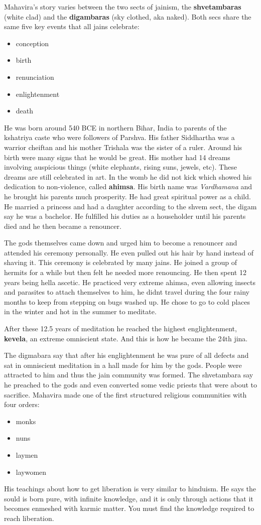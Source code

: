 \documentclass{article}
\begin{document}
Mahavira's story varies between the two sects of jainism, the \textbf{shvetambaras} (white clad) and the \textbf{digambaras} (sky clothed, aka naked). Both secs share the same five key events that all jains celebrate:
\begin{itemize}
	\item conception
	\item birth
	\item renunciation
	\item enlightenment
	\item death
\end{itemize}
He was born around 540 BCE in northern Bihar, India to parents of the kshatriya caste who were followers of Parshva. His father Siddhartha was a warrior cheiftan and his mother Trishala was the sister of a ruler. Around his birth were many signs that he would be great. His mother had 14 dreams involving auspicious things (white elephants, rising suns, jewels, etc). These dreams are still celebrated in art. In the womb he did not kick which showed his dedication to non-violence, called \textbf{ahimsa}. His birth name was \emph{Vardhamana} and he brought his parents much prosperity. He had great spiritual power as a child. He married a princess and had a daughter according to the shvem sect, the digam say he was a bachelor. He fulfilled his duties as a householder until his parents died and he then became a renouncer.

The gods themselves came down and urged him to become a renouncer and attended his ceremony personally. He even pulled out his hair by hand instead of shaving it. This ceremony is celebrated by many jains. He joined a group of hermits for a while but then felt he needed more renouncing. He then spent 12 years being hella ascetic. He practiced very extreme ahimsa, even allowing insects and parasites to attach themselves to him, he didnt travel during the four rainy months to keep from stepping on bugs washed up. He chose to go to cold places in the winter and hot in the summer to meditate.

After these 12.5 years of meditation he reached the highest englightenment, \textbf{kevela}, an extreme omniscient state. And this is how he became the 24th jina.

The digmabara say that after his englightenment he was pure of all defects and sat in omniscient meditation in a hall made for him by the gods. People were attracted to him and thus the jain community was formed. The shvetambara say he preached to the gods and even converted some vedic priests that were about to sacrifice. Mahavira made one of the first structured religious communities with four orders:
\begin{itemize}
	\item monks
	\item nuns
	\item laymen
	\item laywomen
\end{itemize}
His teachings about how to get liberation is very similar to hinduism. He says the sould is born pure, with infinite knowledge, and it is only through actions that it becomes enmeshed with karmic matter. You must find the knowledge required to reach liberation.
\end{document}
